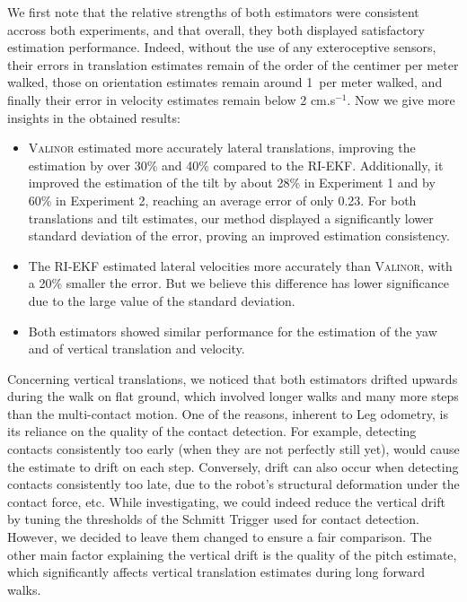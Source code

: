 \documentclass{IJCAS}
\begin{document}
We first note that the relative strengths of both estimators were consistent accross both experiments, and that overall, they both displayed satisfactory estimation performance. Indeed, without the use of any exteroceptive sensors, their errors in translation estimates remain of the order of the centimer per meter walked, those on orientation estimates remain around 1\textdegree \ per meter walked, and finally their error in velocity estimates remain below 2 cm.s$^{-1}$. Now we give more insights in the obtained results:
\begin{itemize}
    \item {\scshape Valinor} estimated more accurately lateral translations, improving the estimation by over 30\% and 40\% compared to the RI-EKF. Additionally, it improved the estimation of the tilt by about 28\% in Experiment 1 and by 60\% in Experiment 2, reaching an average error of only 0.23\textdegree. For both translations and tilt estimates, our method displayed a significantly lower standard deviation of the error, proving an improved estimation consistency. 
    \item The RI-EKF estimated lateral velocities more accurately than {\scshape Valinor}, with a 20\% smaller the error. But we believe this difference has lower significance due to the large value of the standard deviation.
    \item Both estimators showed similar performance for the estimation of the yaw and of vertical translation and velocity.
\end{itemize}

Concerning vertical translations, we noticed that both estimators drifted upwards during the walk on flat ground, which involved longer walks and many more steps than the multi-contact motion. One of the reasons, inherent to Leg odometry, is its reliance on the quality of the contact detection. For example, detecting contacts consistently too early (when they are not perfectly still yet), would cause the estimate to drift on each step. Conversely, drift can also occur when detecting contacts consistently too late, due to the robot's structural deformation under the contact force, etc. While investigating, we could indeed reduce the vertical drift by tuning the thresholds of the Schmitt Trigger used for contact detection. However, we decided to leave them changed to ensure a fair comparison. The other main factor explaining the vertical drift is the quality of the pitch estimate, which significantly affects vertical translation estimates during long forward walks.
\end{document}
